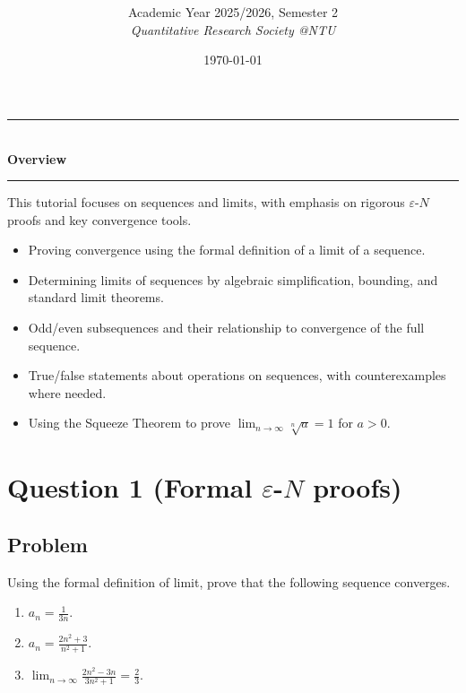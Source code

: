 \documentclass[12pt]{article}
\title{
\CourseCode \CourseName \\[0.3em]
\large \DocType
}
\author{
  Academic Year 2025/2026, Semester 2 \\[0.25em]
  \textit{Quantitative Research Society @NTU}
}
\date{\today}
\begin{document}
\maketitle
\thispagestyle{plainfirst}
\pagestyle{main}

\bigskip


\begin{center}
\rule{0.8\textwidth}{0.4pt}\\[4pt]
\textbf{Overview}\\[2pt]
\rule{0.8\textwidth}{0.4pt}
\end{center}

\noindent
This tutorial focuses on sequences and limits, with emphasis on rigorous \(\varepsilon\)-\(N\) proofs and key convergence tools.

\begin{itemize}[leftmargin=*]
\item Proving convergence using the formal definition of a limit of a sequence.
\item Determining limits of sequences by algebraic simplification, bounding, and standard limit theorems.
\item Odd/even subsequences and their relationship to convergence of the full sequence.
\item True/false statements about operations on sequences, with counterexamples where needed.
\item Using the Squeeze Theorem to prove \(\lim_{n\to\infty}\sqrt[n]{a}=1\) for \(a>0\).
\end{itemize}

\bigskip

\newpage


\section*{Question 1 (Formal \(\varepsilon\)-\(N\) proofs)}

\subsection*{Problem}
Using the formal definition of limit, prove that the following sequence converges.
\begin{enumerate}[label=(\alph*)]
\item \(\displaystyle a_n=\frac{1}{3n}\).
\item \(\displaystyle a_n=\frac{2n^{2}+3}{n^{2}+1}\).
\item \(\displaystyle \lim_{n\to\infty}\frac{2n^{2}-3n}{3n^{2}+1}=\frac{2}{3}.\)
\end{enumerate}
\end{document}
